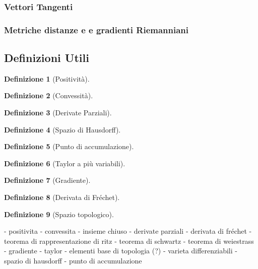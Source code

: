\documentclass[a4paper, 12pt]{article}
\newtheorem{definition}{Definizione}
\begin{document}
\subsubsection{Vettori Tangenti}
\subsubsection{Metriche distanze e e gradienti Riemanniani}
\subsection{Definizioni Utili}
\begin{definition}[Positività]
\end{definition}
\begin{definition}[Convessità]
\end{definition}
\begin{definition}[Derivate Parziali]
\end{definition}
\begin{definition}[Spazio di Hausdorff]
\end{definition}
\begin{definition}[Punto di accumulazione]
\end{definition}
\begin{definition}[Taylor a più variabili]
\end{definition}
\begin{definition}[Gradiente]
\end{definition}
\begin{definition}[Derivata di Fréchet]
\end{definition}
\begin{definition}[Spazio topologico]
\end{definition}

- positivita
- convessita
- insieme chiuso
- derivate parziali
- derivata di fréchet
- teorema di rappresentazione di ritz
- teorema di schwartz
- teorema di weiestrass
- gradiente 
- taylor
- elementi base di topologia (?)
- varieta differenziabili
- spazio di hausdorff
- punto di accumulazione
\end{document}
